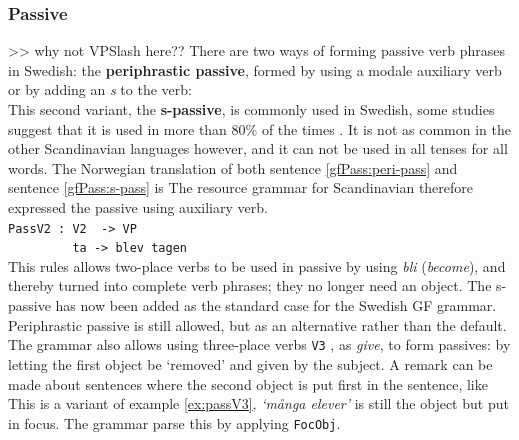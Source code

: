 \documentclass{report}
\begin{document}
\subsubsection{Passive}
>> why not VPSlash here??
There are two ways of forming passive verb phrases in Swedish: the 
\textbf{periphrastic passive}, formed by using a modale auxiliary verb \\
\label{gfPass:peri-pass}
or by adding an \emph{s} to
the verb: \\
\label{gfPass:s-pass}
This second variant, the \textbf{s-passive}, is commonly used in Swedish, some studies
suggest that it is used in more than 80\% of the times \cite{laanemets}.
It is not as common in the other Scandinavian languages however, 
and it can not be used in all tenses for all words. The Norwegian 
translation of both sentence \ref{gfPass:peri-pass} and sentence  \ref{gfPass:s-pass} is
The resource grammar for Scandinavian therefore expressed the passive using auxiliary verb. \\
\verb|PassV2 : V2  -> VP | \\
\verb|         ta -> blev tagen| \\
This rules allows two-place verbs to be used in passive by using \emph{bli} (\emph{become}), and thereby
turned into complete verb phrases; they no longer need an object.
The s-passive has now been added as the standard case for the Swedish GF
grammar. Periphrastic passive is still allowed, but as an alternative rather
than the default.
The grammar also allows using three-place verbs \verb|V3| , as \emph{give}, to
form passives:
\label{ex:passV3}
by letting the first object be `removed' and given by the subject. 
A remark can be made about sentences where the second object is put first in the sentence, like 
This is a variant of example \ref{ex:passV3}, \emph{`många elever'} is still the object but put in focus. The grammar
parse this by applying \verb|FocObj|.
\end{document}
